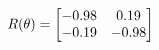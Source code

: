 \documentclass[preview]{standalone}
\begin{document}
\begin{align*}
\special{dvisvgm:raw <g id='unique000'>}R(\theta) = \begin{bmatrix}-0.98 & 0.19\\-0.19 & -0.98\end{bmatrix}\special{dvisvgm:raw </g>}
\end{align*}
\end{document}
